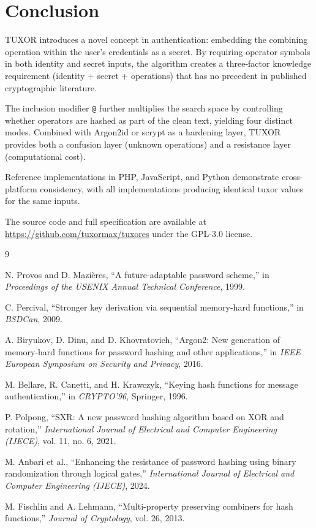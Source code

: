 \documentclass[11pt,a4paper]{article}
\begin{document}
\section{Conclusion}

TUXOR introduces a novel concept in authentication: embedding the combining operation within the user's credentials as a secret. By requiring operator symbols in both identity and secret inputs, the algorithm creates a three-factor knowledge requirement (identity + secret + operations) that has no precedent in published cryptographic literature.

The inclusion modifier \texttt{@} further multiplies the search space by controlling whether operators are hashed as part of the clean text, yielding four distinct modes. Combined with Argon2id or scrypt as a hardening layer, TUXOR provides both a confusion layer (unknown operations) and a resistance layer (computational cost).

Reference implementations in PHP, JavaScript, and Python demonstrate cross-platform consistency, with all implementations producing identical tuxor values for the same inputs.

The source code and full specification are available at \url{https://github.com/tuxormax/tuxores} under the GPL-3.0 license.

\begin{thebibliography}{9}

N. Provos and D. Mazi\`{e}res, ``A future-adaptable password scheme,'' in \textit{Proceedings of the USENIX Annual Technical Conference}, 1999.

C. Percival, ``Stronger key derivation via sequential memory-hard functions,'' in \textit{BSDCan}, 2009.

A. Biryukov, D. Dinu, and D. Khovratovich, ``Argon2: New generation of memory-hard functions for password hashing and other applications,'' in \textit{IEEE European Symposium on Security and Privacy}, 2016.

M. Bellare, R. Canetti, and H. Krawczyk, ``Keying hash functions for message authentication,'' in \textit{CRYPTO'96}, Springer, 1996.

P. Polpong, ``SXR: A new password hashing algorithm based on XOR and rotation,'' \textit{International Journal of Electrical and Computer Engineering (IJECE)}, vol. 11, no. 6, 2021.

M. Anbari et al., ``Enhancing the resistance of password hashing using binary randomization through logical gates,'' \textit{International Journal of Electrical and Computer Engineering (IJECE)}, 2024.

M. Fischlin and A. Lehmann, ``Multi-property preserving combiners for hash functions,'' \textit{Journal of Cryptology}, vol. 26, 2013.

\end{thebibliography}
\end{document}

